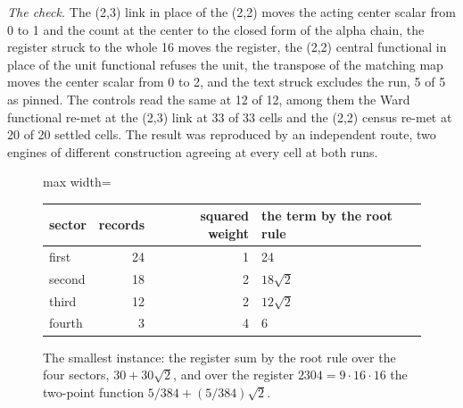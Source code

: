 \begin{chproof}
\textit{The check.} The (2,3) link in place of the (2,2) moves the acting center scalar from 0 to 1 and the count at the center to the closed form of the alpha chain, the register struck to the whole 16 moves the register, the (2,2) central functional in place of the unit functional refuses the unit, the transpose of the matching map moves the center scalar from 0 to 2, and the text struck excludes the run, 5 of 5 as pinned. The controls read the same at 12 of 12, among them the Ward functional re-met at the (2,3) link at 33 of 33 cells and the (2,2) census re-met at 20 of 20 settled cells. The result was reproduced by an independent route, two engines of different construction agreeing at every cell at both runs.
\end{chproof}
\begin{figure}[h]
\centering
\begin{adjustbox}{max width=\linewidth}\begin{tabular}{lrrl}
\hline
sector & records & squared weight & the term by the root rule \\
\hline
first & 24 & 1 & 24 \\
second & 18 & 2 & $18\sqrt{2}$ \\
third & 12 & 2 & $12\sqrt{2}$ \\
fourth & 3 & 4 & 6 \\
\hline
\end{tabular}\end{adjustbox}
\caption{The smallest instance: the register sum by the root rule over the four sectors, $30 + 30\sqrt{2}$, and over the register $2304 = 9\cdot 16\cdot 16$ the two-point function $5/384 + (5/384)\sqrt{2}$.}
\end{figure}

